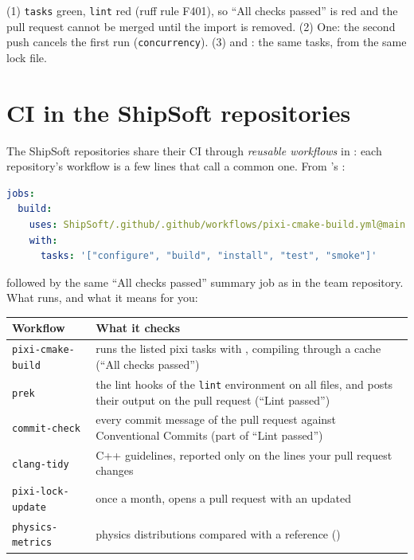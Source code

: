 \begin{solution}
(1) \texttt{tasks} green, \texttt{lint} red (ruff rule F401), so ``All checks
passed'' is red and the pull request cannot be merged until the import is
removed. (2) One: the second push cancels the first run
(\texttt{concurrency}). (3)  and :
the same tasks, from the same lock file.
\end{solution}

\section{CI in the ShipSoft repositories}

The ShipSoft repositories share their CI through \emph{reusable workflows} in
: each repository's workflow is a few lines that call a common
one. From 's :
\begin{lstlisting}[language=yaml]
jobs:
  build:
    uses: ShipSoft/.github/.github/workflows/pixi-cmake-build.yml@main
    with:
      tasks: '["configure", "build", "install", "test", "smoke"]'
\end{lstlisting}
followed by the same ``All checks passed'' summary job as in the team
repository. What runs, and what it means for you:

\begin{center}\small
\begin{tabularx}{\linewidth}{l L}
\toprule
Workflow & What it checks \\
\midrule
\texttt{pixi-cmake-build} & runs the listed pixi tasks with , compiling through
                            a cache (``All checks passed'') \\
\texttt{prek}             & the lint hooks of the \texttt{lint} environment on all files, and posts
                            their output on the pull request (``Lint passed'') \\
\texttt{commit-check}     & every commit message of the pull request against Conventional Commits
                            (part of ``Lint passed'') \\
\texttt{clang-tidy}       & C++ guidelines, reported only on the lines your pull request changes \\
\texttt{pixi-lock-update} & once a month, opens a pull request with an updated  \\
\texttt{physics-metrics}  & physics distributions compared with a reference () \\
\bottomrule
\end{tabularx}
\end{center}


